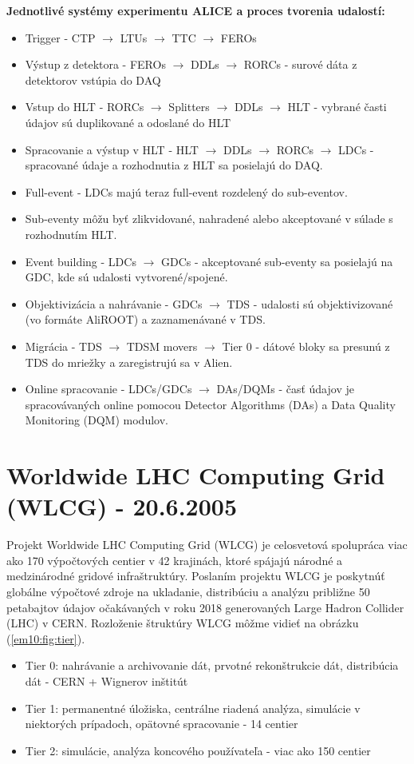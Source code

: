 \documentclass[../../main.tex]{subfiles}
\begin{document}
\textbf{Jednotlivé systémy experimentu ALICE a proces tvorenia udalostí:}
\begin{itemize}
\item Trigger - CTP $\rightarrow$ LTUs $\rightarrow$ TTC $\rightarrow$ FEROs
\item Výstup z detektora - FEROs $\rightarrow$ DDLs $\rightarrow$ RORCs - surové dáta z detektorov vstúpia do DAQ
\item Vstup do HLT - RORCs $\rightarrow$ Splitters $\rightarrow$ DDLs $\rightarrow$ HLT - vybrané časti údajov sú duplikované a odoslané do HLT
\item Spracovanie a výstup v HLT - HLT $\rightarrow$ DDLs $\rightarrow$ RORCs $\rightarrow$ LDCs - spracované údaje a rozhodnutia z HLT sa posielajú do DAQ.
\item Full-event - LDCs majú teraz full-event rozdelený do sub-eventov.
\item Sub-eventy môžu byť zlikvidované, nahradené alebo akceptované v súlade s rozhodnutím HLT.
\item Event building - LDCs $\rightarrow$ GDCs - akceptované sub-eventy sa posielajú na GDC, kde sú udalosti vytvorené/spojené.
\item Objektivizácia a nahrávanie - GDCs $\rightarrow$ TDS - udalosti sú objektivizované (vo formáte AliROOT) a zaznamenávané v TDS.
\item Migrácia - TDS $\rightarrow$ TDSM movers $\rightarrow$ Tier 0 - dátové bloky sa presunú z TDS do mriežky a zaregistrujú sa v Alien.
\item Online spracovanie - LDCs/GDCs $\rightarrow$ DAs/DQMs - časť údajov je spracovávaných online pomocou Detector Algorithms (DAs) a Data Quality Monitoring (DQM) modulov.
\end{itemize}

\section{Worldwide LHC Computing Grid (WLCG) - 20.6.2005}
Projekt Worldwide LHC Computing Grid (WLCG) je celosvetová spolupráca viac ako 170 výpočtových centier v 42 krajinách, ktoré spájajú národné a medzinárodné gridové infraštruktúry. Poslaním projektu WLCG je poskytnúť globálne výpočtové zdroje na ukladanie, distribúciu a analýzu približne 50 petabajtov údajov očakávaných v roku 2018 generovaných Large Hadron Collider (LHC) v CERN. Rozloženie štruktúry WLCG môžme vidieť na obrázku (\ref{em10:fig:tier}).

\begin{itemize}
\item Tier 0: nahrávanie a archivovanie dát, prvotné rekonštrukcie dát, distribúcia dát - CERN + Wignerov inštitút
\item Tier 1: permanentné úložiska, centrálne riadená analýza, simulácie v niektorých prípadoch, opätovné spracovanie - 14 centier
\item Tier 2: simulácie, analýza koncového používateľa - viac ako 150 centier
\end{itemize}
\end{document}
